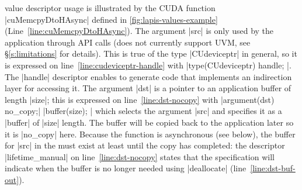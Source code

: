 {
\Lapis value descriptor usage is illustrated by the CUDA function \spec|cuMemcpyDtoHAsync| defined in \autoref{fig:lapis-values-example} (Line~\ref{line:cuMemcpyDtoHAsync}).
The argument \spec|src| is only used by the application through API calls
(\AvA does not currently support UVM, see \S\ref{s:limitations} for details).
This is true of the type \spec|CUdeviceptr| in general, so it
is expressed on line~\ref{line:cudeviceptr-handle} with \spec|type(CUdeviceptr) { handle; }|.
The \spec|handle| descriptor enables \AvA to generate code that implements an indirection layer for accessing it.
The argument \spec|dst| is a pointer to an application buffer of length \spec|size|; this is expressed on line~\ref{line:dst-nocopy} with \spec|argument(dst) { no_copy;| \spec|buffer(size); }| which selects the argument \spec|src| and specifies it as a \spec|buffer| of \spec|size| length.
The buffer will be copied back to the application later so it is \spec|no_copy| here.
Because the function is asynchronous (see below), the buffer for \spec|src| in the \worker must exist at least until the copy has completed:
the descriptor \spec|lifetime_manual| on line~\ref{line:dst-nocopy} states that the specification will indicate when the buffer is no longer needed using \spec|deallocate| (line~\ref{line:dst-buf-out}).




}
